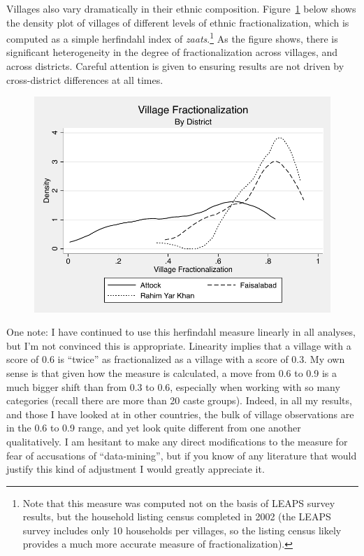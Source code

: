 \documentclass[12pt]{article}
\begin{document}
Villages also vary dramatically in their ethnic composition. Figure~\ref{fracdensities} below shows the density plot of villages of different levels of ethnic fractionalization, which is computed as a simple herfindahl index of \emph{zaats}.\footnote{Note that this measure was computed not on the basis of LEAPS survey results, but the household listing census completed in 2002 (the LEAPS survey includes only 10 households per villages, so the listing census likely provides a much more accurate measure of fractionalization).} As the figure shows, there is significant heterogeneity in the degree of fractionalization across villages, and across districts. Careful attention is given to ensuring results are not driven by cross-district differences at all times.

\begin{figure}[htb]
	\begin{center}
	\caption{}\label{fracdensities}
	\includegraphics[scale=1.0]{graphs/village_frac_by_district.pdf}
	\end{center}
\end{figure}


One note: I have continued to use this herfindahl measure linearly in all analyses, but I'm not convinced this is appropriate. Linearity implies that a village with a score of 0.6 is ``twice'' as fractionalized as a village with a score of 0.3.  My own sense is that given how the measure is calculated, a move from 0.6 to 0.9 is a much bigger shift than from 0.3 to 0.6, especially when working with so many categories (recall there are more than 20 caste groups). Indeed, in all my results, and those I have looked at in other countries, the bulk of village observations are in the 0.6 to 0.9 range, and yet look quite different from one another qualitatively. I am hesitant to make any direct modifications to the measure for fear of accusations of ``data-mining'', but if you know of any literature that would justify this kind of adjustment I would greatly appreciate it. 
\end{document}
